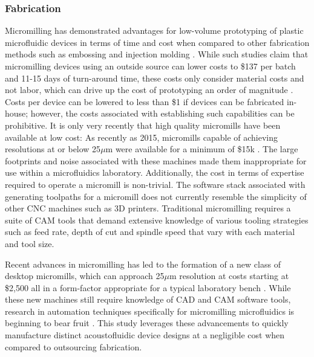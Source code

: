 \subsubsection{Fabrication}
\label{ssec:fab}

Micromilling has demonstrated advantages for low-volume prototyping of plastic microfluidic devices in terms of time and cost when compared to other fabrication methods such as embossing and injection molding \cite{guckenberger2015micromilling}. While such studies claim that micromilling devices using an outside source can lower costs to \$137 per batch and 11-15 days of turn-around time, these costs only consider material costs and not labor, which can drive up the cost of prototyping an order of magnitude \cite{guckenberger2015micromilling}. Costs per device can be lowered to less than \$1 if devices can be fabricated in-house; however, the costs associated with establishing such capabilities can be prohibitive. It is only very recently that high quality micromills have been available at low cost: As recently as 2015, micromills capable of achieving resolutions at or below 25$\mu$m were available for a minimum of \$15k \cite{guckenberger2015micromilling}. The large footprints and noise associated with these machines made them inappropriate for use within a microfluidics laboratory. Additionally, the cost in terms of expertise required to operate a micromill is non-trivial. The software stack associated with generating toolpaths for a micromill does not currently resemble the simplicity of other CNC machines such as 3D printers. Traditional micromilling requires a suite of CAM tools that demand extensive knowledge of various tooling strategies such as feed rate, depth of cut and spindle speed that vary with each material and tool size. 

Recent advances in micromilling has led to the formation of a new class of desktop micromills, which can approach 25$\mu$m resolution at costs starting at \$2,500 all in a form-factor appropriate for a typical laboratory bench \cite{yen2016cost}. While these new machines still require knowledge of CAD and CAM software tools, research in automation techniques specifically for micromilling microfluidics is beginning to bear fruit \cite{silva2016iwbda}\cite{mcdaniel2017case}. This study leverages these advancements to quickly manufacture distinct acoustofluidic device designs at a negligible cost when compared to outsourcing fabrication.

